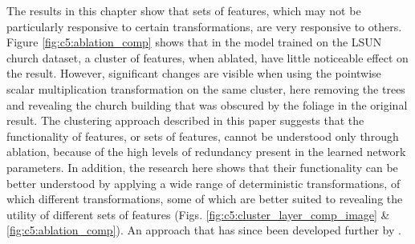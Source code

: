 The results in this chapter show that sets of features, which may not be particularly responsive to certain transformations, are very responsive to others. 
Figure \ref{fig:c5:ablation_comp} shows that in the model trained on the LSUN church dataset, a cluster of features, when ablated, have little noticeable effect on the result.
However, significant changes are visible when using the pointwise scalar multiplication transformation on the same cluster, here removing the trees and revealing the church building that was obscured by the foliage in the original result. 
The clustering approach described in this paper suggests that the functionality of features, or sets of features, cannot be understood only through ablation, because of the high levels of redundancy present in the learned network parameters. 
In addition, the research here shows that their functionality can be better understood by applying a wide range of deterministic transformations, of which different transformations, some of which are better suited to revealing the utility of different sets of features (Figs. \ref{fig:c5:cluster_layer_comp_image} \& \ref{fig:c5:ablation_comp}). 
An approach that has since been developed further by \cite{oldfield2022panda,oldfield2024bilinear}.

